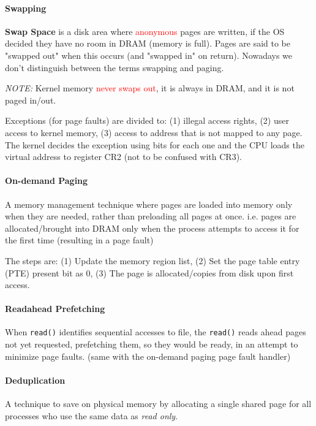 \documentclass[openany,12pt]{book}
\newcommand{\code}[1]{\texttt{#1}}
\newcommand{\red}[1]{\textcolor{Red}{#1}}
\begin{document}
\paragraph{Swapping} \textbf{Swap Space} is a disk area where \red{anonymous} pages are written, if the OS decided they have no room in DRAM (memory is full). Pages are said to be "swapped out" when this occurs (and "swapped in" on return). Nowadays we don't distinguish between the terms swapping and paging.
  

\textit{NOTE:} Kernel memory \red{never swaps out}, it is always in DRAM, and it is not paged in/out. 

Exceptions (for page faults) are divided to: (1) illegal access rights, (2) user access to kernel memory, (3) access to address that is not mapped to any page. The kernel decides the exception using bits for each one and the CPU loads the virtual address to register CR2 (not to be confused with CR3).

\paragraph{On-demand Paging} A memory management technique where pages are loaded into memory only when they are needed, rather than preloading all pages at once. i.e. pages are allocated/brought into DRAM only when the process attempts to access it for the first time (resulting in a page fault)

The steps are: (1) Update the memory region list, (2) Set the page table entry (PTE) present bit as 0, (3) The page is allocated/copies from disk upon first access.

\paragraph{Readahead Prefetching} When \code{read()} identifies sequential accesses to file, the \code{read()} reads ahead pages not yet requested, prefetching them, so they would be ready, in an attempt to minimize page faults. (same with the on-demand paging page fault handler)


\paragraph{Deduplication} A technique to save on physical memory by allocating a single shared page for all processes who use the same data as \textit{read only}.
\end{document}
